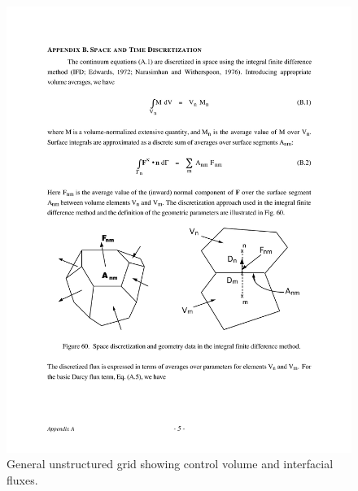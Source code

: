 \documentclass[12pt]{article}
\begin{document}
\begin{figure}[h]\centering
\includegraphics[scale=0.65]{./figs/unstruct_grid}
\caption{General unstructured grid showing control volume and interfacial fluxes.}\label{funstruct}
\end{figure}
\end{document}
